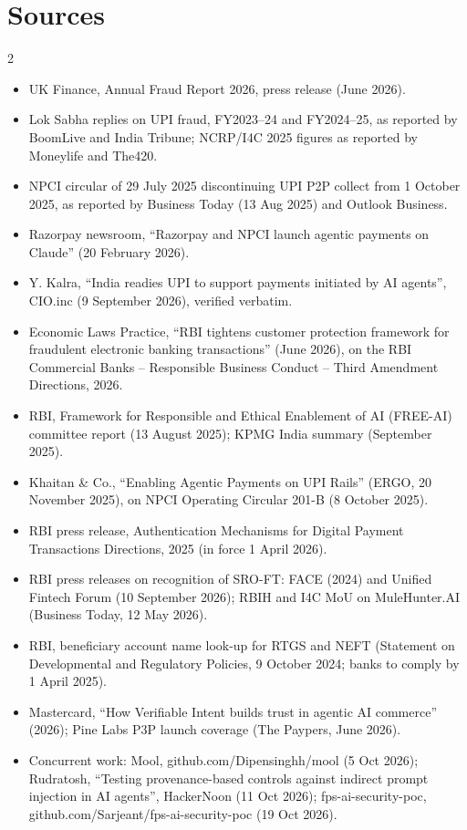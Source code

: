 \documentclass[10pt,a4paper]{article}
\begin{document}
\section*{Sources}
{\scriptsize
\begin{multicols}{2}
\begin{itemize}
\item UK Finance, Annual Fraud Report 2026, press release (June 2026).
\item Lok Sabha replies on UPI fraud, FY2023--24 and FY2024--25, as reported by BoomLive and India Tribune; NCRP/I4C 2025 figures as reported by Moneylife and The420.
\item NPCI circular of 29 July 2025 discontinuing UPI P2P collect from 1 October 2025, as reported by Business Today (13 Aug 2025) and Outlook Business.
\item Razorpay newsroom, ``Razorpay and NPCI launch agentic payments on Claude'' (20 February 2026).
\item Y. Kalra, ``India readies UPI to support payments initiated by AI agents'', CIO.inc (9 September 2026), verified verbatim.
\item Economic Laws Practice, ``RBI tightens customer protection framework for fraudulent electronic banking transactions'' (June 2026), on the RBI Commercial Banks -- Responsible Business Conduct -- Third Amendment Directions, 2026.
\item RBI, Framework for Responsible and Ethical Enablement of AI (FREE-AI) committee report (13 August 2025); KPMG India summary (September 2025).
\item Khaitan \& Co., ``Enabling Agentic Payments on UPI Rails'' (ERGO, 20 November 2025), on NPCI Operating Circular 201-B (8 October 2025).
\item RBI press release, Authentication Mechanisms for Digital Payment Transactions Directions, 2025 (in force 1 April 2026).
\item RBI press releases on recognition of SRO-FT: FACE (2024) and Unified Fintech Forum (10 September 2026); RBIH and I4C MoU on MuleHunter.AI (Business Today, 12 May 2026).
\item RBI, beneficiary account name look-up for RTGS and NEFT (Statement on Developmental and Regulatory Policies, 9 October 2024; banks to comply by 1 April 2025).
\item Mastercard, ``How Verifiable Intent builds trust in agentic AI commerce'' (2026); Pine Labs P3P launch coverage (The Paypers, June 2026).
\item Concurrent work: Mool, github.com/Dipensinghh/mool (5 Oct 2026); Rudratosh, ``Testing provenance-based controls against indirect prompt injection in AI agents'', HackerNoon (11 Oct 2026); fps-ai-security-poc, github.com/Sarjeant/fps-ai-security-poc (19 Oct 2026).

\end{itemize}
\end{multicols}}
\end{document}
